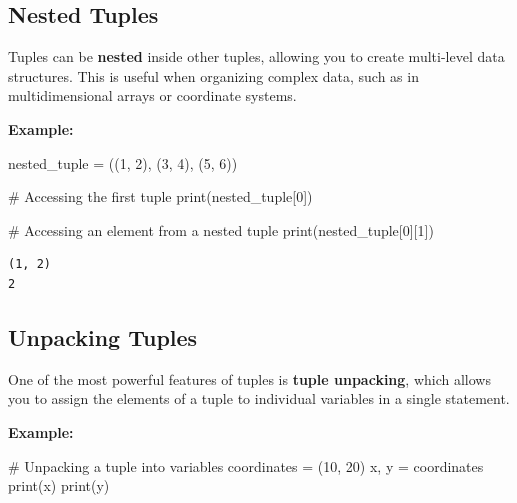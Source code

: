\documentclass[
  letterpaper,
  DIV=11,
  numbers=noendperiod]{scrreprt}
\newenvironment{Shaded}{\begin{snugshade}}{\end{snugshade}}
\newcommand{\BuiltInTok}[1]{\textcolor[rgb]{0.00,0.23,0.31}{#1}}
\newcommand{\CommentTok}[1]{\textcolor[rgb]{0.37,0.37,0.37}{#1}}
\newcommand{\DecValTok}[1]{\textcolor[rgb]{0.68,0.00,0.00}{#1}}
\newcommand{\NormalTok}[1]{\textcolor[rgb]{0.00,0.23,0.31}{#1}}
\newcommand{\OperatorTok}[1]{\textcolor[rgb]{0.37,0.37,0.37}{#1}}
\begin{document}
\hypertarget{nested-tuples}{%
\subsection{Nested Tuples}\label{nested-tuples}}

Tuples can be \textbf{nested} inside other tuples, allowing you to
create multi-level data structures. This is useful when organizing
complex data, such as in multidimensional arrays or coordinate systems.

\textbf{Example:}

\begin{Shaded}
\begin{Highlighting}[]
\NormalTok{nested\_tuple }\OperatorTok{=}\NormalTok{ ((}\DecValTok{1}\NormalTok{, }\DecValTok{2}\NormalTok{), (}\DecValTok{3}\NormalTok{, }\DecValTok{4}\NormalTok{), (}\DecValTok{5}\NormalTok{, }\DecValTok{6}\NormalTok{))}

\CommentTok{\# Accessing the first tuple}
\BuiltInTok{print}\NormalTok{(nested\_tuple[}\DecValTok{0}\NormalTok{])  }

\CommentTok{\# Accessing an element from a nested tuple}
\BuiltInTok{print}\NormalTok{(nested\_tuple[}\DecValTok{0}\NormalTok{][}\DecValTok{1}\NormalTok{])  }
\end{Highlighting}
\end{Shaded}

\begin{verbatim}
(1, 2)
2
\end{verbatim}

\hypertarget{unpacking-tuples}{%
\subsection{Unpacking Tuples}\label{unpacking-tuples}}

One of the most powerful features of tuples is \textbf{tuple unpacking},
which allows you to assign the elements of a tuple to individual
variables in a single statement.

\textbf{Example:}

\begin{Shaded}
\begin{Highlighting}[]
\CommentTok{\# Unpacking a tuple into variables}
\NormalTok{coordinates }\OperatorTok{=}\NormalTok{ (}\DecValTok{10}\NormalTok{, }\DecValTok{20}\NormalTok{)}
\NormalTok{x, y }\OperatorTok{=}\NormalTok{ coordinates}
\BuiltInTok{print}\NormalTok{(x)  }
\BuiltInTok{print}\NormalTok{(y)  }
\end{Highlighting}
\end{Shaded}
\end{document}
